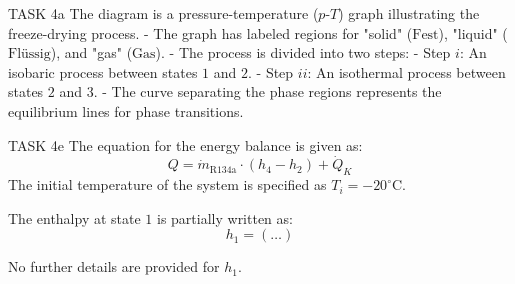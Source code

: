 TASK 4a  
The diagram is a pressure-temperature (\( p \)-\( T \)) graph illustrating the freeze-drying process.  
- The graph has labeled regions for "solid" (\( \text{Fest} \)), "liquid" (\( \text{Flüssig} \)), and "gas" (\( \text{Gas} \)).  
- The process is divided into two steps:  
  - Step \( i \): An isobaric process between states \( 1 \) and \( 2 \).  
  - Step \( ii \): An isothermal process between states \( 2 \) and \( 3 \).  
- The curve separating the phase regions represents the equilibrium lines for phase transitions.  

TASK 4e  
The equation for the energy balance is given as:  
\[
Q = \dot{m}_{\text{R134a}} \cdot (h_4 - h_2) + \dot{Q}_K
\]  
The initial temperature of the system is specified as \( T_i = -20^\circ\text{C} \).  

The enthalpy at state \( 1 \) is partially written as:  
\[
h_1 = (\ldots)
\]  

No further details are provided for \( h_1 \).